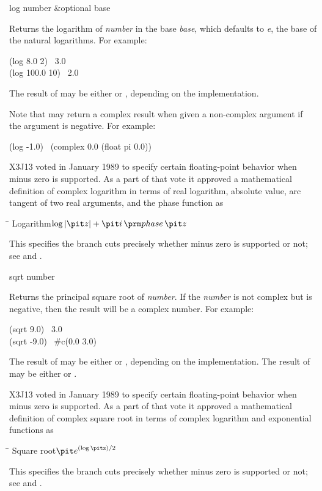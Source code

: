 \begin{defun}[Function]
log number &optional base

Returns the logarithm of {\it number} in the base {\it base},
which defaults to {\it e}, the base of the natural logarithms.
For example:
\begin{lisp}
(log 8.0 2) \EV\ 3.0 \\
(log 100.0 10) \EV\ 2.0
\end{lisp}
The result of  may be either  or , depending on the
implementation.

Note that  may return a complex result when given a non-complex
argument if the argument is negative.  For example:
\begin{lisp}
(log -1.0) \EQ\ (complex 0.0 (float pi 0.0))
\end{lisp}

\begin{new}
X3J13 voted in January 1989
to specify certain floating-point behavior when minus zero is supported.
As a part of that vote it approved a mathematical definition of complex logarithm
in terms of real logarithm, absolute value,
arc tangent of two real arguments, and the phase function as
\begin{tabbing}
\hskip 10pc\=\kill
Logarithm\>\( \log \left| {\it z} \right| + {\it i} \phase {\it z} \)
\end{tabbing}
This specifies the branch cuts precisely whether minus zero is supported or not;
see  and .
\end{new}
\end{defun}

\begin{defun}[Function]
sqrt number

Returns the principal square root of {\it number}.
If the {\it number} is not complex but is negative, then the result
will be a complex number.
For example:
\begin{lisp}
(sqrt 9.0) \EV\ 3.0 \\
(sqrt -9.0) \EV\ \#c(0.0 3.0)
\end{lisp}
The result of  may be either  or , depending on the
implementation.  The result of  may be either 
or .

\begin{new}
X3J13 voted in January 1989
to specify certain floating-point behavior when minus zero is supported.
As a part of that vote it approved a mathematical definition of complex square root
in terms of complex logarithm and exponential functions as
\begin{tabbing}
\hskip 10pc\=\kill
Square root\>\( {\it e}^{(\log \hbox{\scriptsize\it z})/2} \)
\end{tabbing}
This specifies the branch cuts precisely whether minus zero is supported or not;
see  and .
\end{new}
\end{defun}

